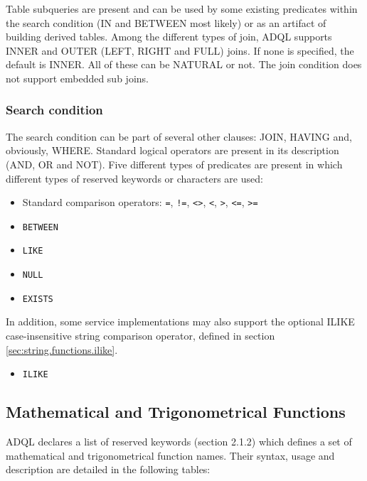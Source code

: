 \documentclass[11pt,a4paper]{ivoa}
\begin{document}
Table subqueries are present and can be used by some existing predicates
within the search condition (IN and BETWEEN most likely) or as an artifact
of building derived tables. Among the different types of join, ADQL supports
INNER and OUTER (LEFT, RIGHT and FULL) joins. If none is specified, the
default is INNER. All of these can be NATURAL or not. The join condition
does not support embedded sub joins.

\subsubsection{Search condition}
\label{sec:search}

The search condition can be part of several other clauses: JOIN, HAVING and,
obviously, WHERE. Standard logical operators are present in its description
(AND, OR and NOT). Five different types of predicates are present in which
different types of reserved keywords or characters are used:

\begin{itemize}
    \item Standard comparison operators: \verb:=:, \verb:!=:, \verb:<>:, \verb:<:, \verb:>:, \verb:<=:, \verb:>=:
    \item \verb:BETWEEN:
    \item \verb:LIKE:
    \item \verb:NULL:
    \item \verb:EXISTS:
\end{itemize}

In addition, some service implementations may also support the optional
ILIKE case-insensitive string comparison operator, defined in section \ref{sec:string.functions.ilike}.

\begin{itemize}
    \item \verb:ILIKE:
\end{itemize}

\clearpage
\subsection{Mathematical and Trigonometrical Functions}
\label{sec:math.functions}

ADQL declares a list of reserved keywords (section 2.1.2) which defines
a set of mathematical and trigonometrical function names. Their syntax,
usage and description are detailed in the following tables:
\end{document}
